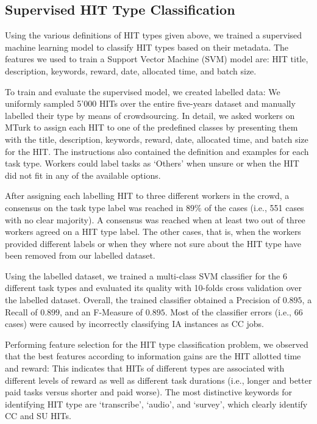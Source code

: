 \subsection{Supervised HIT Type Classification}
Using the various definitions of HIT types given above, we trained a supervised machine learning model to classify HIT types based on their metadata. The features we used to train a Support Vector Machine (SVM) model are: HIT title, description, keywords, reward, date, allocated time, and batch size.

To train and evaluate the supervised model, we created labelled data: We uniformly sampled 5'000 HITs over the entire five-years dataset and manually labelled their type by means of crowdsourcing. In detail, we asked workers on MTurk to assign each HIT to one of the predefined classes by presenting them with the title, description, keywords, reward, date, allocated time, and batch size for the HIT. The instructions also contained the definition and examples for each task type. Workers could label tasks as `Others' when unsure or when the HIT did not fit in any of the available options.

After assigning each labelling HIT to three different workers in the crowd, a consensus on the task type label was reached in $89\%$ of the cases (i.e., 551 cases with no clear majority). A consensus was reached when at least two out of three workers agreed on a HIT type label. The other cases, that is, when the workers provided different labels or when they where not sure about the HIT type have been removed from our labelled dataset.

Using the labelled dataset, we trained a multi-class SVM classifier for the 6 different task types and evaluated its quality with 10-folds cross validation over the labelled dataset. Overall, the trained classifier obtained a Precision of $0.895$, a Recall of $0.899$, and an F-Measure of $0.895$. Most of the classifier errors (i.e., 66 cases) were caused by incorrectly classifying IA instances as CC jobs.

Performing feature selection for the HIT type classification problem, we observed that the best features according to information gains are the HIT allotted time and reward: This indicates that HITs of different types are associated with different levels of reward as well as different task durations (i.e., longer and better paid tasks versus shorter and paid worse). 
The most distinctive keywords for identifying HIT type are `transcribe', `audio', and `survey', which clearly identify CC and SU HITs.
 
